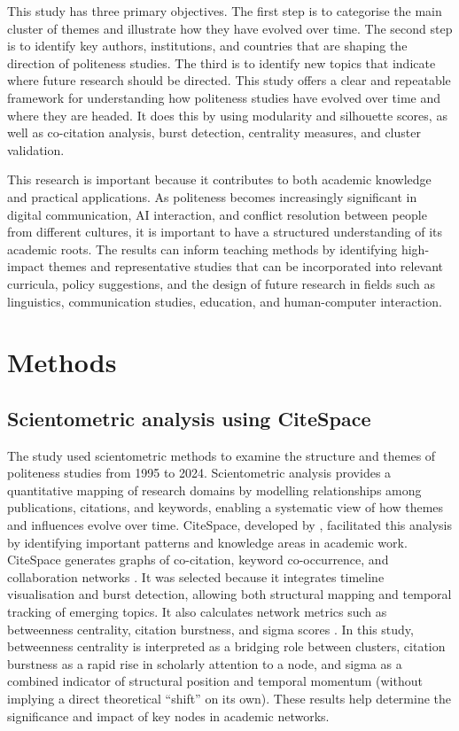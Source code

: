 \documentclass[english]{textolivre}
\begin{document}
This study has three primary objectives. The first step is to categorise the main cluster of themes and illustrate how they have evolved over time. The second step is to identify key authors, institutions, and countries that are shaping the direction of politeness studies. The third is to identify new topics that indicate where future research should be directed. This study offers a clear and repeatable framework for understanding how politeness studies have evolved over time and where they are headed. It does this by using modularity and silhouette scores, as well as co-citation analysis, burst detection, centrality measures, and cluster validation.

This research is important because it contributes to both academic knowledge and practical applications. As politeness becomes increasingly significant in digital communication, AI interaction, and conflict resolution between people from different cultures, it is important to have a structured understanding of its academic roots. The results can inform teaching methods by identifying high-impact themes and representative studies that can be incorporated into relevant curricula, policy suggestions, and the design of future research in fields such as linguistics, communication studies, education, and human-computer interaction.

\section{Methods}

\subsection{Scientometric analysis using CiteSpace}
The study used scientometric methods to examine the structure and themes of politeness studies from 1995 to 2024. Scientometric analysis provides a quantitative mapping of research domains by modelling relationships among publications, citations, and keywords, enabling a systematic view of how themes and influences evolve over time. CiteSpace, developed by \textcite{chen2006}, facilitated this analysis by identifying important patterns and knowledge areas in academic work. CiteSpace generates graphs of co-citation, keyword co-occurrence, and collaboration networks \cite{chen2010}. It was selected because it integrates timeline visualisation and burst detection, allowing both structural mapping and temporal tracking of emerging topics. It also calculates network metrics such as betweenness centrality, citation burstness, and sigma scores \cite{yaqin2025a}. In this study, betweenness centrality is interpreted as a bridging role between clusters, citation burstness as a rapid rise in scholarly attention to a node, and sigma as a combined indicator of structural position and temporal momentum (without implying a direct theoretical ``shift'' on its own). These results help determine the significance and impact of key nodes in academic networks.
\end{document}

